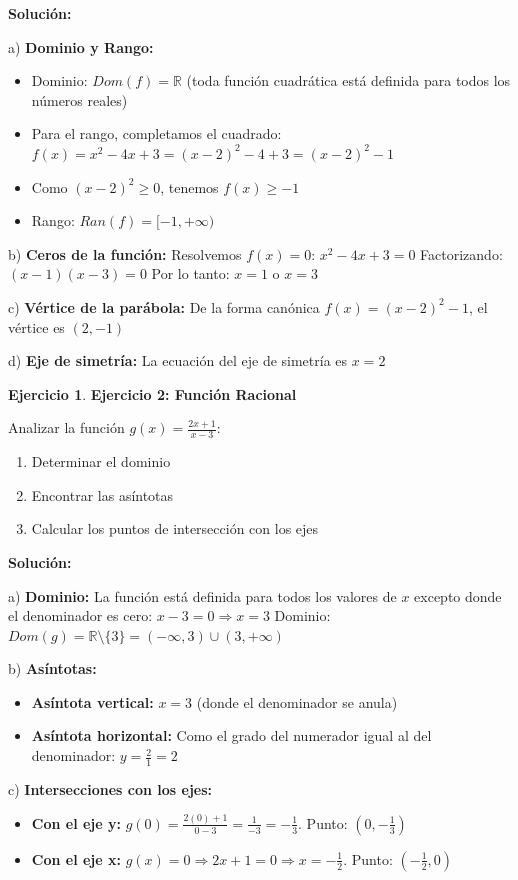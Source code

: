 \documentclass[12pt, a4paper, oneside]{book}
\theoremstyle{definition}
\newtheorem{ejercicio}{Ejercicio}[chapter]
\begin{document}
\textbf{Solución:}

a) \textbf{Dominio y Rango:}
\begin{itemize}
    \item Dominio: $Dom(f) = \mathbb{R}$ (toda función cuadrática está definida para todos los números reales)
    \item Para el rango, completamos el cuadrado:
    $f(x) = x^2 - 4x + 3 = (x-2)^2 - 4 + 3 = (x-2)^2 - 1$
    \item Como $(x-2)^2 \geq 0$, tenemos $f(x) \geq -1$
    \item Rango: $Ran(f) = [-1, +\infty)$
\end{itemize}

b) \textbf{Ceros de la función:}
Resolvemos $f(x) = 0$:
$x^2 - 4x + 3 = 0$
Factorizando: $(x-1)(x-3) = 0$
Por lo tanto: $x = 1$ o $x = 3$

c) \textbf{Vértice de la parábola:}
De la forma canónica $f(x) = (x-2)^2 - 1$, el vértice es $(2, -1)$

d) \textbf{Eje de simetría:}
La ecuación del eje de simetría es $x = 2$

\begin{ejercicio}
\textbf{Ejercicio 2: Función Racional}

Analizar la función $g(x) = \frac{2x + 1}{x - 3}$:
\begin{enumerate}[label=\alph*)]
    \item Determinar el dominio
    \item Encontrar las asíntotas
    \item Calcular los puntos de intersección con los ejes
\end{enumerate}
\end{ejercicio}

\textbf{Solución:}

a) \textbf{Dominio:}
La función está definida para todos los valores de $x$ excepto donde el denominador es cero:
$x - 3 = 0 \Rightarrow x = 3$
Dominio: $Dom(g) = \mathbb{R} \setminus \{3\} = (-\infty, 3) \cup (3, +\infty)$

b) \textbf{Asíntotas:}
\begin{itemize}
    \item \textbf{Asíntota vertical:} $x = 3$ (donde el denominador se anula)
    \item \textbf{Asíntota horizontal:} Como el grado del numerador igual al del denominador:
    $y = \frac{2}{1} = 2$
\end{itemize}

c) \textbf{Intersecciones con los ejes:}
\begin{itemize}
    \item \textbf{Con el eje y:} $g(0) = \frac{2(0) + 1}{0 - 3} = \frac{1}{-3} = -\frac{1}{3}$. Punto: $(0, -\frac{1}{3})$
    \item \textbf{Con el eje x:} $g(x) = 0 \Rightarrow 2x + 1 = 0 \Rightarrow x = -\frac{1}{2}$. Punto: $(-\frac{1}{2}, 0)$
\end{itemize}
\end{document}
